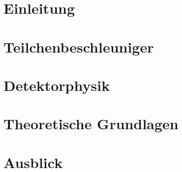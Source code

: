 \documentclass[bachelor,       %
               twoside,        %
               BCOR10mm,       %
              english,ngerman, %
               ]{GAUBM}
\begin{document}
\mainmatter   %

\chapter{Einleitung}

\chapter{Teilchenbeschleuniger}

\chapter{Detektorphysik}

\chapter{Theoretische Grundlagen}

\chapter{Ausblick}


\cleardoublepage
 


\end{document}
